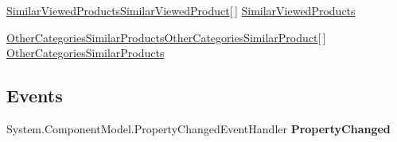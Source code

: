 \begin{DoxyCompactItemize}
\begin{DoxyCompactList}\small\item\em \end{DoxyCompactList}\item 
\hypertarget{class_amazon___price___finder_1_1amazon_1_1ecs_1_1_cart_a3d91051558fb94d26106103819506e39}{\hyperlink{class_amazon___price___finder_1_1amazon_1_1ecs_1_1_similar_viewed_products_similar_viewed_product}{Similar\-Viewed\-Products\-Similar\-Viewed\-Product}\mbox{[}$\,$\mbox{]} \hyperlink{class_amazon___price___finder_1_1amazon_1_1ecs_1_1_cart_a3d91051558fb94d26106103819506e39}{Similar\-Viewed\-Products}}\label{class_amazon___price___finder_1_1amazon_1_1ecs_1_1_cart_a3d91051558fb94d26106103819506e39}

\begin{DoxyCompactList}\small\item\em \end{DoxyCompactList}\item 
\hypertarget{class_amazon___price___finder_1_1amazon_1_1ecs_1_1_cart_ae17319f42fefd4d0df4e8b1bbaa58f1c}{\hyperlink{class_amazon___price___finder_1_1amazon_1_1ecs_1_1_other_categories_similar_products_other_categories_similar_product}{Other\-Categories\-Similar\-Products\-Other\-Categories\-Similar\-Product}\mbox{[}$\,$\mbox{]} \hyperlink{class_amazon___price___finder_1_1amazon_1_1ecs_1_1_cart_ae17319f42fefd4d0df4e8b1bbaa58f1c}{Other\-Categories\-Similar\-Products}}\label{class_amazon___price___finder_1_1amazon_1_1ecs_1_1_cart_ae17319f42fefd4d0df4e8b1bbaa58f1c}

\begin{DoxyCompactList}\small\item\em \end{DoxyCompactList}\end{DoxyCompactItemize}
\subsection*{Events}
\begin{DoxyCompactItemize}
\item 
\hypertarget{class_amazon___price___finder_1_1amazon_1_1ecs_1_1_cart_a54236060e36f15b7245e4b3fa162d6b0}{System.\-Component\-Model.\-Property\-Changed\-Event\-Handler {\bfseries Property\-Changed}}\label{class_amazon___price___finder_1_1amazon_1_1ecs_1_1_cart_a54236060e36f15b7245e4b3fa162d6b0}

\end{DoxyCompactItemize}


